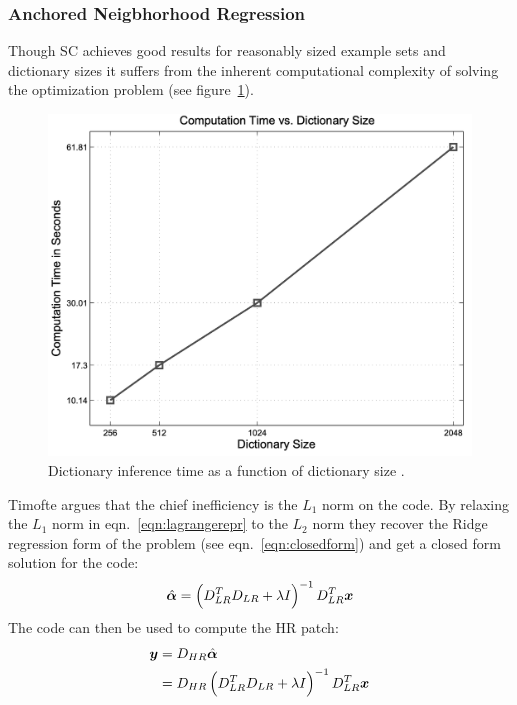\subsubsection{Anchored Neigbhorhood Regression}
Though SC achieves good results for reasonably sized example sets and dictionary sizes it suffers from the inherent computational complexity of solving the optimization problem (see figure~\ref{fig:dictspeedspize}).
\begin{figure}
    \centering
    \includegraphics[width=\linewidth,keepaspectratio]{figures/classical/dictsizespeed.png}
    \caption{Dictionary inference time as a function of dictionary size \cite{yang2010}.}
    \label{fig:dictspeedspize}
\end{figure}
%
Timofte \etal \cite{Timofte} argues that the chief inefficiency is the \(L_1\) norm on the code.
%
By relaxing the \(L_1\) norm in eqn.~\eqref{eqn:lagrangerepr} to the \(L_2\) norm they recover the Ridge regression form of the problem (see eqn.~\eqref{eqn:closedform}) and get a closed form solution for the code:
\begin{equation}
    \hat{\bm{\alpha}} = \left( D_{LR}^T D_{LR} + \lambda I\right)^{-1}D_{LR}^T \bm{x}
\end{equation}
The code can then be used to compute the HR patch:
\begin{align}
    \bm{y} & = D_{HR} \hat{\bm{\alpha}}                                                               \\
        & = D_{HR} \left( D_{LR}^T D_{LR} + \lambda I\right)^{-1}D_{LR}^T \label{eqn:mappinglr}\bm{x}
\end{align}
